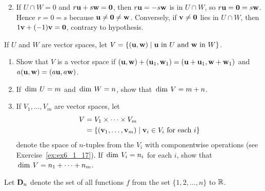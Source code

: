 \begin{multicols}{2}
\begin{ex}
\begin{enumerate}[label={\alph*.}]
\end{enumerate}
\begin{sol}
\begin{enumerate}[label={\alph*.}]
\setcounter{enumi}{1}
\item  If $U \cap W = 0$ and $r\textbf{u} + s\textbf{w} = \textbf{0}$, then $r\textbf{u} = -s\textbf{w}$ is in $U \cap W$, so $r\textbf{u} = \textbf{0} = s\textbf{w}$. Hence $r = 0 = s$ because $\textbf{u} \neq \textbf{0} \neq \textbf{w}$. Conversely, if $\textbf{v} \neq \textbf{0}$ lies in $U \cap W$, then $1\textbf{v} + (-1)\textbf{v} = \textbf{0}$, contrary to hypothesis.

\end{enumerate}
\end{sol}
\end{ex}

\begin{ex} \label{ex:6_3_34}
If $U$ and $W$ are vector spaces, let $V = \{(\textbf{u}, \textbf{w}) \mid \textbf{u} \mbox{ in } U \mbox{ and } \textbf{w} \mbox{ in } W\}$.

\begin{enumerate}[label={\alph*.}]
\item Show that $V$ is a vector space if $(\textbf{u}, \textbf{w}) + (\textbf{u}_{1}, \textbf{w}_{1}) = (\textbf{u} + \textbf{u}_{1}, \textbf{w} + \textbf{w}_{1})$ and $a(\textbf{u}, \textbf{w}) = (a\textbf{u}, a\textbf{w})$.

\item If $\thinspace\operatorname{dim\medspace} U = m$ and $\thinspace\operatorname{dim\medspace} W = n$, show that \newline $\thinspace\operatorname{dim\medspace} V = m + n$.

\item If $V_{1}, \dots, V_{m}$ are vector spaces, let 
\begin{align*}
V &= V_{1} \times \dots \times V_{m} \\
&= \{(\textbf{v}_{1}, \dots, \textbf{v}_{m}) \mid \textbf{v}_{i} \in V_{i} \mbox{ for each } i\}
\end{align*}
 denote the space of $n$-tuples from the $V_{i}$ with componentwise operations (see Exercise~\ref{ex:ex6_1_17}). If $\thinspace\operatorname{dim\medspace} V_{i} = n_{i}$ for each $i$, show that $\thinspace\operatorname{dim\medspace} V = n_{1} + \dots + n_{m}$.

\end{enumerate}
\end{ex}

\columnbreak

\begin{ex}\label{ex:ex6_3_35}
Let $\textbf{D}_{n}$ denote the set of all functions $f$ from the set $\{1, 2, \dots, n\}$ to $\mathbb{R}$.


\end{ex}
\end{multicols}
